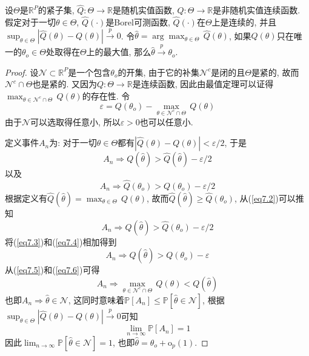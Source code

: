 \documentclass[cn, 12pt, math=mtpro2, bibstyle=apa, blue, twocol]{elegantbook}
\newcommand{\R}{\mathbb{R}}
\newcommand{\PP}{\mathbb{P}}
\newcommand{\limn}{\lim_{n\to\infty}}
\begin{document}
\begin{lemma}[极值估计量的一致性]\label{lem:lem7.2}
设$\Theta$是$\R^P$的紧子集, $\hat{Q}:\Theta\to\R$是随机实值函数, $Q: \Theta\to\R$是非随机实值连续函数. 假定对于一切$\theta\in\Theta$, $\hat{Q}(\cdot)$是Borel可测函数, $\hat{Q}(\cdot)$在$\Theta$上是连续的, 并且$\sup_{\theta\in\Theta}|\hat{Q}(\theta)-Q(\theta)|\xrightarrow{p}0$. 令$\hat{\theta}=\arg\max_{\theta\in\Theta}\,\hat{Q}(\theta)$, 如果$Q(\theta)$只在唯一的$\theta_o\in\Theta$处取得在$\Theta$上的最大值, 那么$\hat{\theta}\xrightarrow{p}\theta_o$.
\end{lemma}
\begin{proof}
设$\mathscr{N}\subset\R^P$是一个包含$\theta_o$的开集, 由于它的补集$\mathscr{N}^c$是闭的且$\Theta$是紧的, 故而$\mathscr{N}^c\cap \Theta$也是紧的. 又因为$Q:\Theta\to\R$是连续函数, 因此由最值定理可以证得$\max_{\theta\in \mathscr{N}^c\cap\Theta}\,Q(\theta)$的存在性. 令
\begin{equation}\label{eq7.5}
  \varepsilon=Q(\theta_o)-\max_{\theta\in \mathscr{N}^c\cap\Theta}\,Q(\theta)
\end{equation}
由于$\mathscr{N}$可以选取得任意小, 所以$\varepsilon>0$也可以任意小.

定义事件$A_n$为: 对于一切$\theta\in\Theta$都有$|\hat{Q}(\theta)-Q(\theta)|<\varepsilon/2$, 于是
\begin{equation}\label{eq7.2}
  A_n\Rightarrow Q(\hat{\theta})>\hat{Q}(\hat{\theta})-\varepsilon/2
\end{equation}
以及
\begin{equation}\label{eq7.3}
  A_n\Rightarrow \hat{Q}(\theta_o)>Q(\theta_o)-\varepsilon/2
\end{equation}
根据定义有$\hat{Q}(\hat{\theta})=\max_{\theta\in\Theta}\,Q(\theta)$, 故而$\hat{Q}(\hat{\theta})\geq\hat{Q}(\theta_o)$, 从(\ref{eq7.2})可以推知
\begin{equation}\label{eq7.4}
  A_n\Rightarrow Q(\hat{\theta})>\hat{Q}(\theta_o)-\varepsilon/2
\end{equation}
将(\ref{eq7.3})和(\ref{eq7.4})相加得到
\begin{equation}\label{eq7.6}
  A_n\Rightarrow Q(\hat{\theta})>Q(\theta_o)-\varepsilon
\end{equation}
从(\ref{eq7.5})和(\ref{eq7.6})可得
$$A_n\Rightarrow\max_{\theta\in \mathscr{N}^c\cap\Theta}\,Q(\theta)<Q(\hat{\theta})$$
也即$A_n\Rightarrow \hat{\theta}\in \mathscr{N}$, 这同时意味着$\PP[A_n]\leq \PP[\hat{\theta}\in \mathscr{N}]$, 根据$\sup_ {\theta\in\Theta}|\hat{Q}(\theta)-Q(\theta)|\xrightarrow{p}0$可知
$$\limn \PP[A_n]=1$$
因此$\displaystyle\limn \PP[\hat{\theta}\in\mathscr{N}]=1$, 也即$\hat{\theta}=\theta_o+\text{o}_p(1)$.
\end{proof}
\end{document}
